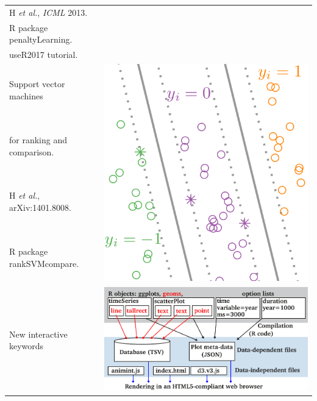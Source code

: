 \documentclass{beamer}
\begin{document}
\begin{frame}
\begin{tabular}{ll}
H {\it et al.}, {\it ICML} 2013. \\
R package penaltyLearning.\\
useR2017 tutorial.\\
\hline
Support vector machines & \multirow{4}{*}{ 
    \includegraphics[height=0.2\textheight]{screenshot-ranksvmcompare}
}\\
for ranking and comparison. \\
H {\it et al.}, arXiv:1401.8008. \\
R package rankSVMcompare.\\
\hline
New interactive keywords& \multirow{5}{*}{
\includegraphics[height=0.2\textheight]{figure-design}
}
\end{tabular}
\end{frame}
\end{document}
